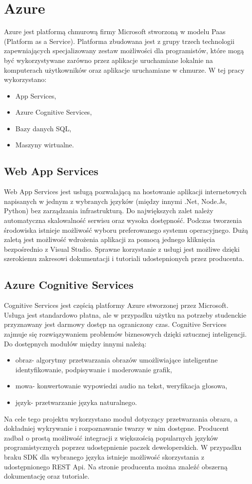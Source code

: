 \section{Azure} \label{azure}
Azure jest platformą chmurową firmy Microsoft stworzoną w modelu Paas (Platform as a Service). Platforma zbudowana jest z grupy trzech technologii zapewniających specjalizowany zestaw możliwości dla programistów, które mogą być wykorzystywane zarówno przez aplikacje uruchamiane lokalnie na komputerach użytkowników oraz aplikacje uruchamiane w chmurze. W tej pracy wykorzystano:
\begin{itemize}
    \item App Services,
    \item Azure Cognitive Services,
    \item Bazy danych SQL,
    \item Maszyny wirtualne.
\end{itemize}
\subsection{Web App Services}
Web App Services jest usługą pozwalającą na hostowanie aplikacji internetowych napisanych w jednym z wybranych języków (między innymi .Net, Node.Js, Python) bez zarządzania infrastrukturą. Do największych zalet należy automatyczna skalowalność serwisu oraz wysoka dostępność. Podczas tworzenia środowiska istnieje możliwość wyboru preferowanego systemu operacyjnego. Dużą zaletą jest możliwość wdrożenia aplikacji za pomocą jednego kliknięcia bezpośrednio z Visual Studio. Sprawne korzystanie z usługi jest możliwe dzięki szerokiemu zakresowi dokumentacji i tutoriali udostepnionych przez producenta.
\subsection{Azure Cognitive Services}
Cognitive Services jest częścią platformy Azure stworzonej przez Microsoft. Usługa jest standardowo płatna, ale w przypadku użytku na potrzeby studenckie przyznawany jest darmowy dostęp na ograniczony czas. Cognitive Services zajmuje się rozwiązywaniem problemów biznesowych dzięki sztucznej inteligencji. Do dostępnych modułów między innymi należą:
\begin{itemize}
\item obraz- algorytmy przetwarzania obrazów umożliwiające inteligentne identyfikowanie, podpisywanie i moderowanie grafik,
\item mowa- konwertowanie wypowiedzi audio na tekst, weryfikacja głosowa,
\item język- przetwarzanie języka naturalnego.
\end{itemize}
Na cele tego projektu wykorzystano moduł dotyczący przetwarzania obrazu, a dokładniej wykrywanie i rozpoznawanie twarzy w nim dostępne. Producent zadbał o prostą możliwość integracji z większością popularnych języków programistycznych poprzez udostępnienie paczek deweloperskich. W przypadku braku SDK dla wybranego języka istnieje możliwość skorzystania z udostępnionego REST Api. Na stronie producenta można znaleźć obszerną dokumentację oraz tutoriale.

